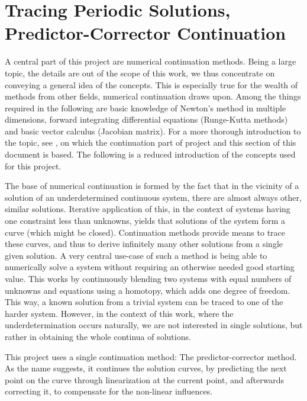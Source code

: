 \section{Tracing Periodic Solutions, Predictor-Corrector Continuation}
\label{sec:cont}


A central part of this project are numerical continuation methods.
Being a large topic, the details are out of the scope of this work, we thus concentrate on conveying a general idea of the concepts.
This is especially true for the wealth of methods from other fields, numerical continuation draws upon.
Among the things required in the following are basic knowledge of Newton's method in multiple dimensions, forward integrating differential equations (Runge-Kutta methods) and basic vector calculus (Jacobian matrix).
For a more thorough introduction to the topic, see \cite{allgower1990numerical}, on which the continuation part of project and this section of this document is based.
The following is a reduced introduction of the concepts used for this project. %

The base of numerical continuation is formed by the fact that in the vicinity of a solution of an underdetermined continuous system, there are almost always other, similar solutions. %
Iterative application of this, in the context of systems having one constraint less than unknowns, yields that solutions of the system form a curve (which might be closed).
Continuation methods provide means to trace these curves, and thus to derive infinitely many other solutions from a single given solution.
A very central use-case of such a method is being able to numerically solve a system without requiring an otherwise needed good starting value.
This works by continuously blending two systems with equal numbers of unknowns and equations using a homotopy, which adds one degree of freedom.
This way, a known solution from a trivial system can be traced to one of the harder system.
However, in the context of this work, where the underdetermination occurs naturally, we are not interested in single solutions, but rather in obtaining the whole continua of solutions.

This project uses a single continuation method: The predictor-corrector method.
As the name suggests, it continues the solution curves, by predicting the next point on the curve through linearization at the current point, and afterwards correcting it, to compensate for the non-linear influences.

